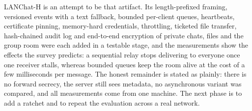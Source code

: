 \documentclass[conference]{IEEEtran}
\begin{document}
LANChat-H is an attempt to be that artifact. Its length-prefixed framing, versioned events with a text fallback, bounded per-client queues, heartbeats, certificate pinning, memory-hard credentials, throttling, ticketed file transfer, hash-chained audit log and end-to-end encryption of private chats, files and the group room were each added in a testable stage, and the measurements show the effects the survey predicts: a sequential relay stops delivering to everyone once one receiver stalls, whereas bounded queues keep the room alive at the cost of a few milliseconds per message. The honest remainder is stated as plainly: there is no forward secrecy, the server still sees metadata, no asynchronous variant was compared, and all measurements come from one machine. The next phase is to add a ratchet and to repeat the evaluation across a real network.
\end{document}
